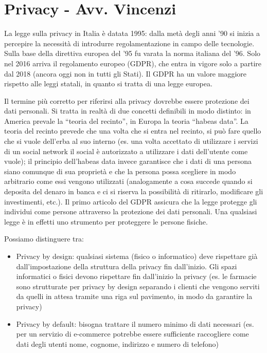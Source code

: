 \chapter{Privacy - Avv. Vincenzi}

La legge sulla privacy in Italia è datata 1995: dalla metà degli anni '90 si inizia a percepire la necessità di introdurre regolamentazione in campo delle tecnologie. Sulla base della direttiva europea del '95 fu varata la norma italiana del '96. 
Solo nel 2016 arriva il regolamento europeo (GDPR), che entra in vigore solo a partire dal 2018 (ancora oggi non in tutti gli Stati).
Il GDPR ha un valore maggiore rispetto alle leggi statali, in quanto si tratta di una legge europea.

Il termine più corretto per riferirsi alla privacy dovrebbe essere protezione dei dati personali. Si tratta in realtà di due concetti definibili in modo distinto: in America prevale la  ``teoria del recinto'', in Europa la teoria ``habeas data''. La teoria del recinto prevede che una volta che si entra nel recinto, si può fare quello che si vuole dell'erba al suo interno (es. una volta accettato di utilizzare i servizi di un social network il social è autorizzato a utilizzare i dati dell'utente come vuole); il principio dell'habeas data invece garantisce che i dati di una persona siano comunque di sua proprietà e che la persona possa scegliere in modo arbitrario come essi vengono utilizzati (analogamente a cosa succede quando si deposita del denaro in banca e ci si riserva la possibilità di ritirarlo, modificare gli investimenti, etc.).
Il primo articolo del GDPR assicura che la legge protegge gli individui come persone attraverso la protezione dei dati personali. Una qualsiasi legge è in effetti uno strumento per proteggere le persone fisiche.

Possiamo distinguere tra:
\begin{itemize}
    \item Privacy by design: qualsiasi sistema (fisico o informatico) deve rispettare già dall'impostazione della struttura della privacy fin dall'inizio. Gli spazi informatici o fisici devono rispettare fin dall'inizio la privacy (es. le farmacie sono strutturate per privacy by design separando i clienti che vengono serviti da quelli in attesa tramite una riga sul pavimento, in modo da garantire la privacy)
    \item Privacy by default: bisogna trattare il numero minimo di dati necessari (es. per un servizio di e-commerce potrebbe essere sufficiente raccogliere come dati degli utenti nome, cognome, indirizzo e numero di telefono)

\end{itemize}

